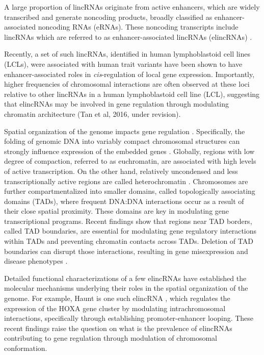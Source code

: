 \documentclass[11pt,a4paper]{report}
\begin{document}
A large proportion of lincRNAs originate from active enhancers, which are widely transcribed and generate noncoding products, broadly classified as enhancer-associated noncoding RNAs (eRNAs). These noncoding transcripts include lincRNAs which are referred to as enhancer-associated lincRNAs (elincRNAs) \cite{Guil2012}. 

Recently, a set of such lincRNAs, identified in human lymphoblastoid cell lines (LCLs), were associated with human trait variants have been shown to have enhancer-associated roles in \textit{cis}-regulation of local gene expression. Importantly, higher frequencies of chromosomal interactions are often observed at these loci relative to other lincRNAs in a human lymphoblastoid cell line (LCL), suggesting that elincRNAs may be involved in gene regulation through modulating chromatin architecture (Tan et al, 2016, under revision).

Spatial organization of the genome impacts gene regulation \cite{Engreitz2016}⁠⁠. Specifically, the folding of genomic DNA into variably compact chromosomal structures can strongly influence expression of the embedded genes \cite{Gorkin2014}⁠⁠. Globally, regions with low degree of compaction, referred to as euchromatin, are associated with high levels of active transcription. On the other hand, relatively uncondensed and less transcriptionally active regions are called heterochromatin \cite{Passarge1979}\cite{Tamaru2010}⁠. Chromosomes are further compartmentalized into smaller domains, called topologically associating domains (TADs), where frequent DNA:DNA interactions occur as a result of their close spatial proximity. These domains are key in modulating gene transcriptional programs. Recent findings show that regions near TAD borders, called TAD boundaries, are essential for modulating gene regulatory interactions within TADs and preventing chromatin contacts across TADs. Deletion of TAD boundaries can disrupt those interactions, resulting in gene misexpression and disease phenotypes \cite{Lupianez2015}⁠.

Detailed functional characterizations of a few elincRNAs have established the molecular mechanisms underlying their roles in the spatial organization of the genome. For example, Haunt is one such elincRNA \cite{Yin2015}⁠⁠, which regulates the expression of the HOXA gene cluster by modulating intrachromosomal interactions, specifically through establishing promoter-enhancer looping. These recent findings raise the question on what is the prevalence of elincRNAs contributing to gene regulation through modulation of chromosomal conformation.
\end{document}
